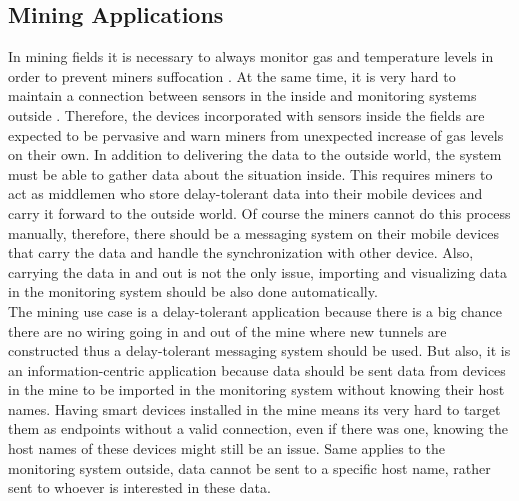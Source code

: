 


\subsection{Mining Applications}

In mining fields it is necessary to always monitor gas and temperature levels in order to prevent miners suffocation \cite{doi:10.1155/2013/159273}. At the same time, it is very hard to maintain a connection between sensors in the inside and  monitoring systems outside \cite{ginzboorg2010dtn}. Therefore, the devices incorporated with sensors inside the fields are expected to be pervasive and warn miners from unexpected increase of gas levels on their own. In addition to delivering the data to the outside world, the system must be able to gather data about the situation inside. This requires miners to act as middlemen who store delay-tolerant data into their mobile devices and carry it forward to the outside world. Of course the miners cannot do this process manually, therefore, there should be a messaging system on their mobile devices that carry the data and handle the synchronization with other device. Also, carrying the data in and out is not the only issue, importing and visualizing  data in the monitoring system should be also done automatically.\\

\noindent The mining use case is a delay-tolerant application because there is a big chance there are no wiring going in and out of the mine where new tunnels are constructed thus a delay-tolerant messaging system should be used. But also, it is an information-centric  application because data should be sent data from  devices in the mine to be imported in  the monitoring system without knowing their host names. Having smart devices installed in the mine means its very hard to target them as endpoints without a valid connection, even if there was one, knowing the host names of these devices might still be an issue. Same applies to the monitoring system outside,  data cannot be sent to a specific host name, rather sent to whoever is interested in  these data.

